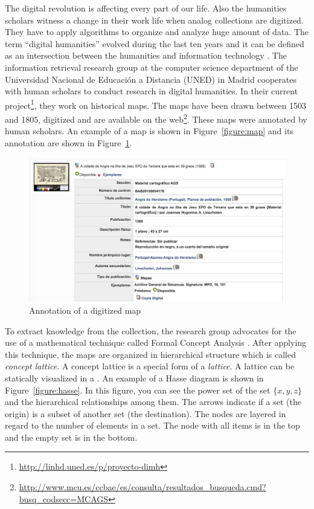 \documentclass[11pt]{report}
\begin{document}
The digital revolution is affecting every part of our life. Also the humanities scholars witness a change in their work life when analog collections are digitized. They have to apply algorithms to organize and analyze huge amount of data. The term ``digital humanities'' evolved during the last ten years and it can be defined as an intersection between the humanities and information technology  \cite{Svensson2010}. The information retrieval research group at the computer science department of the Universidad Nacional de Educación a Distancia (UNED) in Madrid cooperates with human scholars to conduct research in digital humanities. In their current project\footnote{\url{http://linhd.uned.es/p/proyecto-dimh}}, they work on historical maps. The maps have been drawn between 1503 and 1805, digitized and are available on the web\footnote{\url{http://www.mcu.es/ccbae/es/consulta/resultados_busqueda.cmd?busq_codsecc=MCAGS}}. These maps were annotated by human scholars. An example of a map is shown in Figure~\ref{figure:map} and its annotation are shown in Figure~\ref{figure:metadata}.\\

\begin{figure}[!ht]
	\centering
	\includegraphics[width=\linewidth]{./images/metadata}
\caption{Annotation of a digitized map}
\label{figure:metadata}
\end{figure}

To extract knowledge from the collection, the research group advocates \cite{Castellanos,Cigarran} for the use of a mathematical technique called Formal Concept Analysis \cite{Ganter2012}. After applying this technique, the maps are organized in hierarchical structure which is called \textit{concept lattice}. A concept lattice is a special form of a \textit{lattice}. A lattice can be statically visualized in a . An example of a Hasse diagram is shown in Figure~\ref{figure:hasse}. In this figure, you can see the power set of the set $\{x,y,z\}$ and the hierarchical relationships among them. The arrows indicate if a set (the origin) is a subset of another set (the destination). The nodes are layered in regard to the number of elements in a set. The node with all items is in the top and the empty set is in the bottom.\\
\end{document}
